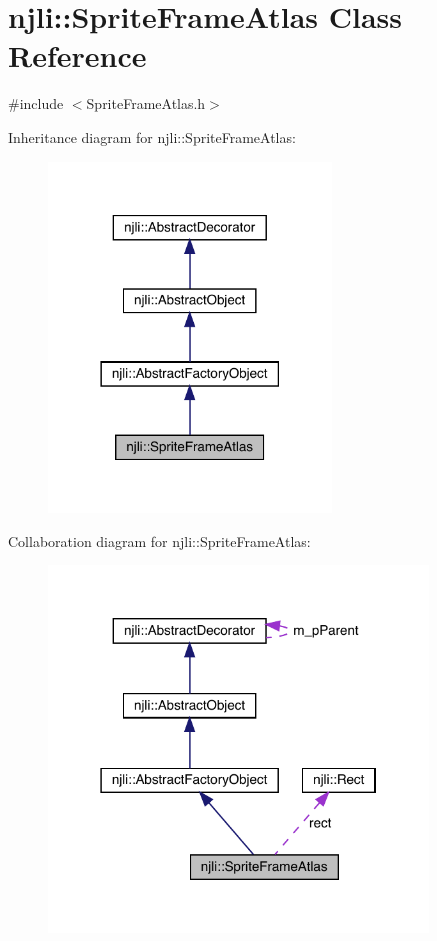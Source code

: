 \hypertarget{classnjli_1_1_sprite_frame_atlas}{}\section{njli\+:\+:Sprite\+Frame\+Atlas Class Reference}
\label{classnjli_1_1_sprite_frame_atlas}


{\ttfamily \#include $<$Sprite\+Frame\+Atlas.\+h$>$}



Inheritance diagram for njli\+:\+:Sprite\+Frame\+Atlas\+:\nopagebreak
\begin{figure}[H]
\begin{center}
\leavevmode
\includegraphics[width=213pt]{classnjli_1_1_sprite_frame_atlas__inherit__graph}
\end{center}
\end{figure}


Collaboration diagram for njli\+:\+:Sprite\+Frame\+Atlas\+:\nopagebreak
\begin{figure}[H]
\begin{center}
\leavevmode
\includegraphics[width=286pt]{classnjli_1_1_sprite_frame_atlas__coll__graph}
\end{center}
\end{figure}
